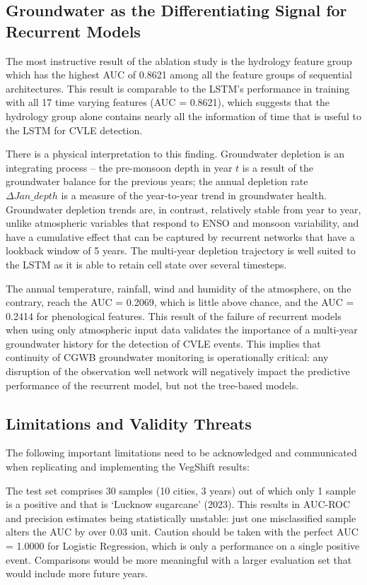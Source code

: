 \documentclass{ieeeaccess}
\begin{document}
\subsection{Groundwater as the Differentiating Signal for Recurrent Models}

The most instructive result of the ablation study is the hydrology feature group which has the highest AUC of 0.8621 among all the feature groups of sequential architectures. This result is comparable to the LSTM's performance in training with all 17 time varying features (AUC = 0.8621), which suggests that the hydrology group alone contains nearly all the information of time that is useful to the LSTM for CVLE detection.

There is a physical interpretation to this finding. Groundwater depletion is an integrating process – the pre-monsoon depth in year $t$ is a result of the groundwater balance for the previous years; the annual depletion rate $\Delta Jan\_depth$ is a measure of the year-to-year trend in groundwater health. Groundwater depletion trends are, in contrast, relatively stable from year to year, unlike atmospheric variables that respond to ENSO and monsoon variability, and have a cumulative effect that can be captured by recurrent networks that have a lookback window of 5 years. The multi-year depletion trajectory is well suited to the LSTM as it is able to retain cell state over several timesteps.

The annual temperature, rainfall, wind and humidity of the atmosphere, on the contrary, reach the AUC = 0.2069, which is little above chance, and the AUC = 0.2414 for phenological features. This result of the failure of recurrent models when using only atmospheric input data validates the importance of a multi-year groundwater history for the detection of CVLE events. This implies that continuity of CGWB groundwater monitoring is operationally critical: any disruption of the observation well network will negatively impact the predictive performance of the recurrent model, but not the tree-based models.

\subsection{Limitations and Validity Threats}

The following important limitations need to be acknowledged and communicated when replicating and implementing the VegShift results:

The test set comprises 30 samples (10 cities, 3 years) out of which only 1 sample is a positive and that is ‘Lucknow sugarcane’ (2023). This results in AUC-ROC and precision estimates being statistically unstable: just one misclassified sample alters the AUC by over 0.03 unit. Caution should be taken with the perfect AUC = 1.0000 for Logistic Regression, which is only a performance on a single positive event. Comparisons would be more meaningful with a larger evaluation set that would include more future years.
\end{document}
